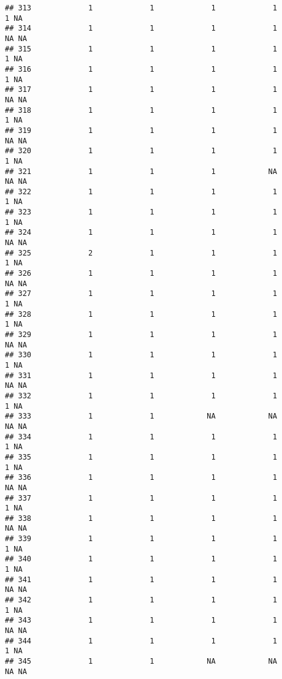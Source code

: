 \documentclass[
]{article}
\begin{document}
\begin{verbatim}
## 313             1             1             1             1             1 NA
## 314             1             1             1             1            NA NA
## 315             1             1             1             1             1 NA
## 316             1             1             1             1             1 NA
## 317             1             1             1             1            NA NA
## 318             1             1             1             1             1 NA
## 319             1             1             1             1            NA NA
## 320             1             1             1             1             1 NA
## 321             1             1             1            NA            NA NA
## 322             1             1             1             1             1 NA
## 323             1             1             1             1             1 NA
## 324             1             1             1             1            NA NA
## 325             2             1             1             1             1 NA
## 326             1             1             1             1            NA NA
## 327             1             1             1             1             1 NA
## 328             1             1             1             1             1 NA
## 329             1             1             1             1            NA NA
## 330             1             1             1             1             1 NA
## 331             1             1             1             1            NA NA
## 332             1             1             1             1             1 NA
## 333             1             1            NA            NA            NA NA
## 334             1             1             1             1             1 NA
## 335             1             1             1             1             1 NA
## 336             1             1             1             1            NA NA
## 337             1             1             1             1             1 NA
## 338             1             1             1             1            NA NA
## 339             1             1             1             1             1 NA
## 340             1             1             1             1             1 NA
## 341             1             1             1             1            NA NA
## 342             1             1             1             1             1 NA
## 343             1             1             1             1            NA NA
## 344             1             1             1             1             1 NA
## 345             1             1            NA            NA            NA NA

\end{verbatim}
\end{document}
